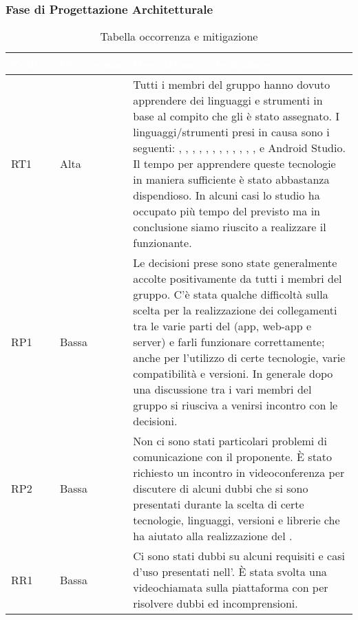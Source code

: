 \subsubsection{Fase di Progettazione Architetturale}
{
\renewcommand{\arraystretch}{2}
\centering
\begin{longtable}{C{2cm} C{3cm} C{10cm}}
\caption{Tabella occorrenza e mitigazione}\\

\textcolor{white}{\textbf{Codice}} & 
\textcolor{white}{\textbf{Occorrenza}} & 
\textcolor{white}{\textbf{Descrizione e risoluzione}}\\	
\endhead

RT1 &
Alta &
Tutti i membri del gruppo hanno dovuto apprendere dei linguaggi e strumenti in base al compito che gli è stato assegnato. I linguaggi/strumenti presi in causa sono i seguenti: , , , , , , , , , , , ,  e Android Studio. Il tempo per apprendere queste tecnologie in maniera sufficiente è stato abbastanza dispendioso. In alcuni casi lo studio ha occupato più tempo del previsto ma in conclusione siamo riuscito a realizzare il  funzionante. \\

RP1 &
Bassa &
Le decisioni prese sono state generalmente accolte positivamente da tutti i membri del gruppo. C'è stata qualche difficoltà sulla scelta per la realizzazione dei collegamenti tra le varie parti del  (app, web-app e server) e farli funzionare correttamente; anche per l'utilizzo di certe tecnologie, varie compatibilità e versioni. In generale dopo una discussione tra i vari membri del gruppo si riusciva a venirsi incontro con le decisioni. \\

RP2 &
Bassa &
Non ci sono stati particolari problemi di comunicazione con il proponente. È stato richiesto un incontro in videoconferenza per discutere di alcuni dubbi che si sono presentati durante la scelta di certe tecnologie, linguaggi, versioni e librerie che ha aiutato alla realizzazione del . \\

RR1 &
Bassa &
Ci sono stati dubbi su alcuni requisiti e casi d'uso presentati nell'. È stata svolta una videochiamata sulla piattaforma  con \CR{} per risolvere dubbi ed incomprensioni. \\


\end{longtable}}
